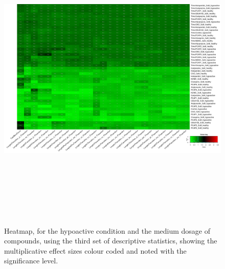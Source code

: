 \documentclass[a4paper,12pt]{article}
\begin{document}
\begin{figure}[h!]
\begin{center}
\includegraphics[width=16cm,height=15cm]{DarkApoLow_heatmap_3_microM_DarkApoLow_B1MAP.png}
\caption{Heatmap, for the hypoactive condition and the medium dosage of compounds, using the third set of descriptive statistics, showing the multiplicative effect sizes colour coded and noted with the significance level.}
\end{center}
\end{figure}
\newpage
\end{document}
